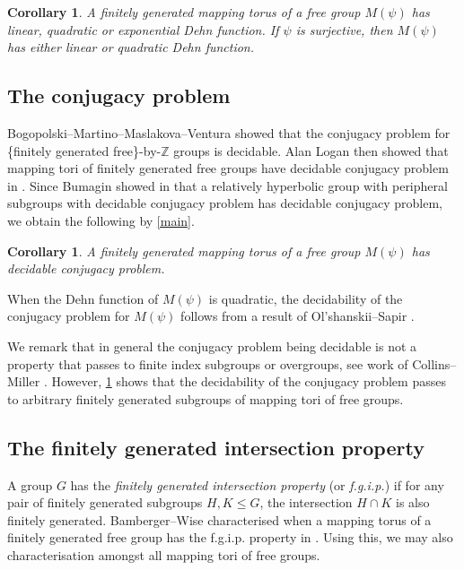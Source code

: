 \documentclass[11pt, a4paper]{amsart}
\newtheorem{corollary}[theorem]{Corollary}
\theoremstyle{definition}
\newcommand{\Z}{\mathbb{Z}}
\begin{document}
\begin{corollary}
\label{dehn_function}
A finitely generated mapping torus of a free group $M(\psi)$ has linear, quadratic or exponential Dehn function. If $\psi$ is surjective, then $M(\psi)$ has either linear or quadratic Dehn function.
\end{corollary}


\subsection{The conjugacy problem}


Bogopolski--Martino--Maslakova--Ventura \cite{BMMV06} showed that the conjugacy problem for \{finitely generated free\}-by-$\Z$ groups is decidable. Alan Logan then showed that mapping tori of finitely generated free groups have decidable conjugacy problem in \cite{Lo23}. Since Bumagin showed in \cite{Bu04} that a relatively hyperbolic group with peripheral subgroups with decidable conjugacy problem has decidable conjugacy problem, we obtain the following by \cref{main}.


\begin{corollary}
\label{conjugacy_problem}
A finitely generated mapping torus of a free group $M(\psi)$ has decidable conjugacy problem.
\end{corollary}

When the Dehn function of $M(\psi)$ is quadratic, the decidability of the conjugacy problem for $M(\psi)$ follows from a result of Ol'shanskii--Sapir \cite{OS06'}.

We remark that in general the conjugacy problem being decidable is not a property that passes to finite index subgroups or overgroups, see work of Collins--Miller \cite{CM77}. However, \cref{conjugacy_problem} shows that the decidability of the conjugacy problem passes to arbitrary finitely generated subgroups of mapping tori of free groups.



\subsection{The finitely generated intersection property}

A group $G$ has the \emph{finitely generated intersection property} (or \emph{f.g.i.p.}) if for any pair of finitely generated subgroups $H, K\leqslant G$, the intersection $H\cap K$ is also finitely generated. Bamberger--Wise characterised when a mapping torus of a finitely generated free group has the f.g.i.p. property in \cite{BW22}. Using this, we may also characterisation amongst all mapping tori of free groups.
\end{document}
